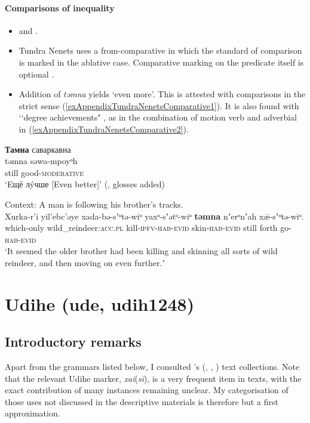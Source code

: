 \paragraph{Comparisons of inequality}\label{appendixTundraNenetsComparisons}
\begin{itemize}
	\item \textcite[458]{Lehtisalo1956} and \textcite[623]{Tereshchenko2008}.
	\item Tundra Nenets uses a from-comparative in which the standard of comparison is marked in the ablative case. Comparative marking on the predicate itself is optional \parencite[174–175]{Nikolaeva2014}.
	\item Addition of \textit{təmna} yields \lq even more\rq{}. This is attested with comparisons in the strict sense (\ref{exAppendixTundraNenetsComparative1}). It is also found with \lq\lq degree achievements"  \parencite{Dowty1979}, as in the combination of motion verb and adverbial in (\ref{exAppendixTundraNenetsComparative2}).
\end{itemize}
	
\begin{exe}
	\ex\label{exAppendixTundraNenetsComparative1}
	\glll \textbf{Тамна} саваркавна\\
	təmna səwa-mpoyᵒh\\
	still good-\textsc{moderative}\\
	\glt \lq Eщё лýчше [Even better]\rq{ }(\cite[623]{Tereshchenko2008}, glosses added)
		
\ex\label{exAppendixTundraNenetsComparative2}
	Context: A man is following his brother's tracks.\\
	\gll Xurka-r’i yil’ebc’əye xada-bə-sʼᵒtə-wiᵒ yaxᵒ-sʼətᵒ-wiᵒ \textbf{təmna} nʼerᵒnʼah xǣ-sʼᵒtə-wiᵒ.\\
	which-only wild\_reindeer:\textsc{acc}.\textsc{pl} kill-\textsc{ipfv}-\textsc{hab}-\textsc{evid} skin-\textsc{hab}-\textsc{evid} still forth go-\textsc{hab}-\textsc{evid}\\
	\glt \lq It seemed the older brother had been killing and skinning all sorts of wild reindeer, and then moving on even further.ʼ \parencite[440]{Nikolaeva2014} 
\end{exe}

\pagebreak
\section{Udihe (ude, udih1248)}
\label{appendixUdihe}
\subsection{Introductory remarks}
Apart from the grammars listed below, I consulted \citeauthor{NikolaevaEtAl2002}'s  (\citeyear{NikolaevaEtAl2002}, \citeyear{NikolaevaEtAl2003}, \citeyear{NikolaevaEtAl2019}) text collections. Note that the relevant Udihe marker, \mbox{\textit{xai}(\textit{si})}, is a very frequent item in texts, with the exact contribution of many instances remaining unclear. My categorisation of those uses not discussed in the descriptive materials is therefore but a first approximation.


